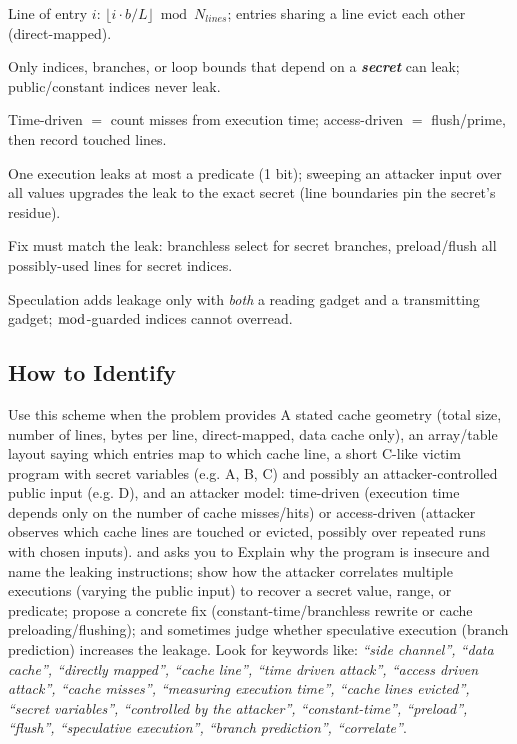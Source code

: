 \documentclass[12pt, a4paper]{article}
\newcommand{\term}[1]{\textbf{\textit{#1}}}        %
\begin{document}
\begin{theorybox}
\begin{tightitem}
    \item Line of entry $i$: $\lfloor i \cdot b / L \rfloor \bmod N_{lines}$; entries sharing a line evict each other (direct-mapped).
    \item Only indices, branches, or loop bounds that depend on a \term{secret} can leak; public/constant indices never leak.
    \item Time-driven $=$ count misses from execution time; access-driven $=$ flush/prime, then record touched lines.
    \item One execution leaks at most a predicate (1 bit); sweeping an attacker input over all values upgrades the leak to the exact secret (line boundaries pin the secret's residue).
    \item Fix must match the leak: branchless select for secret branches, preload/flush all possibly-used lines for secret indices.
    \item Speculation adds leakage only with \emph{both} a reading gadget and a transmitting gadget; $\bmod$-guarded indices cannot overread.
\end{tightitem}
\end{theorybox}

\subsection*{How to Identify}
Use this scheme when the problem provides A stated cache geometry (total size, number of lines, bytes per line, direct-mapped, data cache only), an array/table layout saying which entries map to which cache line, a short C-like victim program with secret variables (e.g. A, B, C) and possibly an attacker-controlled public input (e.g. D), and an attacker model: time-driven (execution time depends only on the number of cache misses/hits) or access-driven (attacker observes which cache lines are touched or evicted, possibly over repeated runs with chosen inputs). and asks you to Explain why the program is insecure and name the leaking instructions; show how the attacker correlates multiple executions (varying the public input) to recover a secret value, range, or predicate; propose a concrete fix (constant-time/branchless rewrite or cache preloading/flushing); and sometimes judge whether speculative execution (branch prediction) increases the leakage. Look for keywords like: \textit{``side channel'', ``data cache'', ``directly mapped'', ``cache line'', ``time driven attack'', ``access driven attack'', ``cache misses'', ``measuring execution time'', ``cache lines evicted'', ``secret variables'', ``controlled by the attacker'', ``constant-time'', ``preload'', ``flush'', ``speculative execution'', ``branch prediction'', ``correlate''}.
\end{document}
